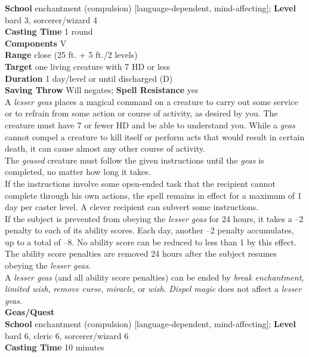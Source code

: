 \textbf{School} enchantment (compulsion) [language-dependent, mind-affecting]; \textbf{Level} bard 3, sorcerer/wizard 4\\
\textbf{Casting Time} 1 round\\
\textbf{Components} V\\
\textbf{Range} close (25 ft. + 5 ft./2 levels)\\
\textbf{Target} one living creature with 7 HD or less\\
\textbf{Duration} 1 day/level or until discharged (D)\\
\textbf{Saving Throw }Will negates; \textbf{Spell Resistance} yes\\
A \textit{lesser geas }places a magical command on a creature to carry out some service or to refrain from some action or course of activity, as desired by you. The creature must have 7 or fewer HD and be able to understand you. While a \textit{geas }cannot compel a creature to kill itself or perform acts that would result in certain death, it can cause almost any other course of activity.\\
The \textit{geased }creature must follow the given instructions until the \textit{geas }is completed, no matter how long it takes.\\
If the instructions involve some open-ended task that the recipient cannot complete through his own actions, the spell remains in effect for a maximum of 1 day per caster level. A clever recipient can subvert some instructions.\\
If the subject is prevented from obeying the \textit{lesser geas }for 24 hours, it takes a --2 penalty to each of its ability scores. Each day, another --2 penalty accumulates, up to a total of --8. No ability score can be reduced to less than 1 by this effect. The ability score penalties are removed 24 hours after the subject resumes obeying the \textit{lesser geas.}\\
A \textit{lesser geas }(and all ability score penalties) can be ended by \textit{break enchantment}, \textit{limited wish}, \textit{remove curse}, \textit{miracle}, or \textit{wish}. \textit{Dispel magic }does not affect a \textit{lesser geas}.\\
\textbf{Geas/Quest}\\
\textbf{School }enchantment (compulsion) [language-dependent, mind-affecting]; \textbf{Level }bard 6, cleric 6, sorcerer/wizard 6\\
\textbf{Casting Time }10 minutes\\
